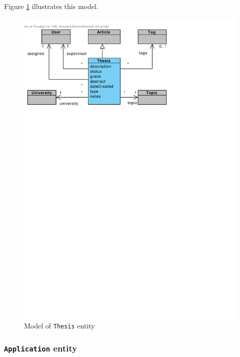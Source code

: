 Figure \ref{fig:domain-thesis-entity} illustrates this model.

\begin{figure}[h]
    \centering
        \includegraphics[trim=0 600 190 30, clip, keepaspectratio, width=\textwidth]{./images/domain-thesis-entity.pdf}
    \caption{Model of \texttt{Thesis} entity}
    \label{fig:domain-thesis-entity}
\end{figure}

\subsubsection{\textbf{\texttt{Application} entity}}

